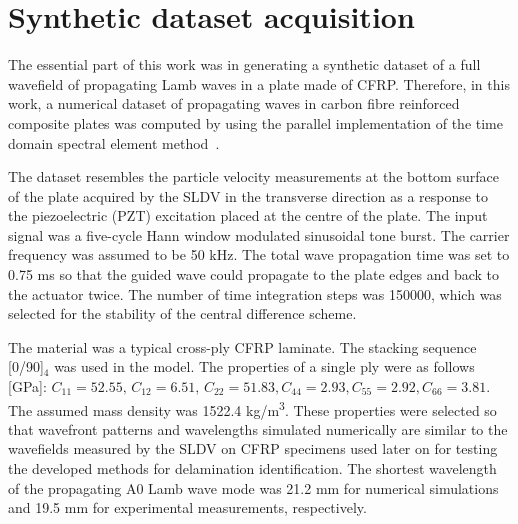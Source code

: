 \section{Synthetic dataset acquisition}
\label{sec41}
The essential part of this work was in generating a synthetic dataset of a full wavefield of propagating Lamb waves in a plate made of CFRP.
Therefore, in this work, a numerical dataset of propagating waves in carbon fibre reinforced composite plates was computed by using the parallel implementation of the time domain spectral element method~\cite{Kudela2020}.

The dataset resembles the particle velocity measurements at the bottom surface of the plate acquired by the SLDV in the transverse direction as a response to the piezoelectric (PZT) excitation placed at the centre of the plate. 
The input signal was a five-cycle Hann window modulated sinusoidal tone burst. 
The carrier frequency was assumed to be 50 kHz. 
The total wave propagation time was set to 0.75 ms so that the guided wave could propagate to the plate edges and back to the actuator twice.
The number of time integration steps was 150000, which was selected for the stability of the central difference scheme.

The material was a typical cross-ply CFRP laminate. 
The stacking sequence [0/90]\(_4\) was used in the model. 
The properties of a single ply were as follows [GPa]:
\(C_{11} = 52.55, \, C_{12} = 6.51, \, C_{22} = 51.83, C_{44} = 2.93, C_{55} = 2.92, C_{66} = 3.81\). 
The assumed mass density was 1522.4 kg/m\textsuperscript{3}.
These properties were selected so that wavefront patterns and wavelengths simulated numerically are similar to the wavefields measured by the SLDV on CFRP specimens used later on for testing the developed methods for delamination identification.
The shortest wavelength of the propagating A0 Lamb wave mode was 21.2 mm for numerical simulations and 19.5 mm for experimental measurements, respectively.

